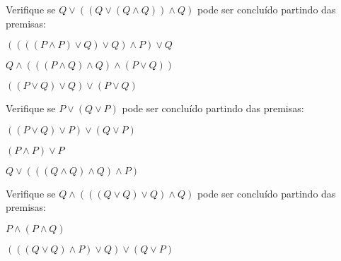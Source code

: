 \documentclass{lib/unichristusdoc}
\begin{document}
    \makeheader

\vspace{1cm}\problem Verifique se $  Q \lor ( ( Q \lor ( Q \land Q ) ) \land Q )  $ pode ser concluído partindo das premisas: 

\subproblem $  ( ( ( ( P \land P ) \lor Q ) \lor Q ) \land P ) \lor Q  $

\subproblem $  Q \land ( ( ( P \land Q ) \land Q ) \land ( P \lor Q ) )  $

\subproblem $  ( ( P \lor Q ) \lor Q ) \lor ( P \lor Q )  $

\vspace{1cm}\problem Verifique se $  P \lor ( Q \lor P )  $ pode ser concluído partindo das premisas: 

\subproblem $  ( ( P \lor Q ) \lor P ) \lor ( Q \lor P )  $

\subproblem $  ( P \land P ) \lor P  $

\subproblem $  Q \lor ( ( ( Q \land Q ) \land Q ) \land P )  $

\vspace{1cm}\problem Verifique se $  Q \land ( ( ( Q \lor Q ) \lor Q ) \land Q )  $ pode ser concluído partindo das premisas: 

\subproblem $  P \land ( P \land Q )  $

\subproblem $  ( ( ( Q \lor Q ) \land P ) \lor Q ) \lor ( Q \lor P )  $
\end{document}
